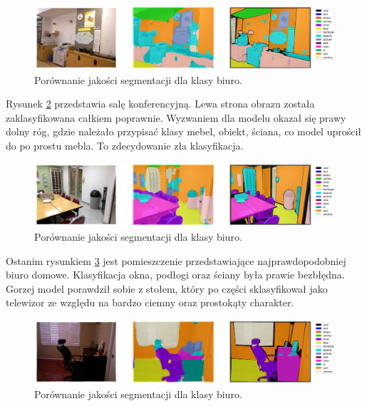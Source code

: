 \begin{figure}[ht!]
    \centering
    \includegraphics[width=\textwidth]{img/preds_analysis/gt_vs_pred/office-1.png}
    \caption{Porównanie jakości segmentacji dla klasy biuro.}
    \label{fig:office-pred-1}
\end{figure}

Rysunek \ref{fig:office-pred-2} przedstawia salę konferencyjną. Lewa strona obrazu została zaklasyfikowana całkiem poprawnie. Wyzwaniem dla modelu okazał się prawy dolny róg, gdzie należało przypisać klasy mebel, obiekt, ściana, co model uprościł do po prostu mebla. To zdecydowanie zła klasyfikacja.

\begin{figure}[ht!]
    \centering
    \includegraphics[width=\textwidth]{img/preds_analysis/gt_vs_pred/office-2.png}
    \caption{Porównanie jakości segmentacji dla klasy biuro.}
    \label{fig:office-pred-2}
\end{figure}

Ostanim rysunkiem {\ref{fig:office-pred-3}} jest pomieszczenie przedstawiające najprawdopodobniej biuro domowe. Klasyfikacja okna, podłogi oraz ściany była prawie bezbłędna. Gorzej model porawdził sobie z stołem, który po części sklasyfikował jako telewizor ze względu na bardzo ciemny oraz prostokąty charakter.

\begin{figure}[ht!]
    \centering
    \includegraphics[width=\textwidth]{img/preds_analysis/gt_vs_pred/office-3.png}
    \caption{Porównanie jakości segmentacji dla klasy biuro.}
    \label{fig:office-pred-3}
\end{figure}

